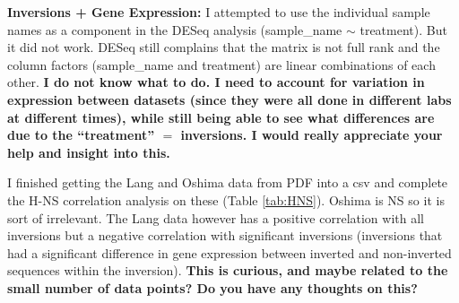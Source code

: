 \documentclass[12pt]{article}
\begin{document}
\textbf{Inversions + Gene Expression:}
I attempted to use the individual sample names as a component in the DESeq analysis (sample\_name $\sim$ treatment).
But it did not work. DESeq still complains that the matrix is not full rank and the column factors (sample\_name and treatment) are linear combinations of each other.
\textbf{I do not know what to do. I need to account for variation in expression between datasets (since they were all done in different labs at different times), while still being able to see what differences are due to the ``treatment'' $=$ inversions. I would really appreciate your help and insight into this.}
 
I finished getting the Lang and Oshima data from PDF into a csv and complete the H-NS correlation analysis on these (Table \ref{tab:HNS}).
Oshima is NS so it is sort of irrelevant.
The Lang data however has a positive correlation with all inversions but a negative correlation with significant inversions (inversions that had a significant difference in gene expression between inverted and non-inverted sequences within the inversion).
\textbf{This is curious, and maybe related to the small number of data points? Do you have any thoughts on this?}
% 
\end{document}
